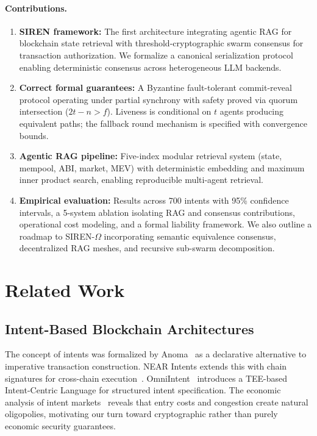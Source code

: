 \documentclass[11pt]{article}
\begin{document}
\paragraph{Contributions.}
\begin{enumerate}
  \item \textbf{SIREN framework:} The first architecture integrating agentic RAG for blockchain state retrieval with threshold-cryptographic swarm consensus for transaction authorization. We formalize a canonical serialization protocol enabling deterministic consensus across heterogeneous LLM backends.
  \item \textbf{Correct formal guarantees:} A Byzantine fault-tolerant commit-reveal protocol operating under partial synchrony with safety proved via quorum intersection ($2t - n > f$). Liveness is conditional on $t$ agents producing equivalent paths; the fallback round mechanism is specified with convergence bounds.
  \item \textbf{Agentic RAG pipeline:} Five-index modular retrieval system (state, mempool, ABI, market, MEV) with deterministic embedding and maximum inner product search, enabling reproducible multi-agent retrieval.
  \item \textbf{Empirical evaluation:} Results across 700 intents with 95\% confidence intervals, a 5-system ablation isolating RAG and consensus contributions, operational cost modeling, and a formal liability framework. We also outline a roadmap to SIREN-$\Omega$ incorporating semantic equivalence consensus, decentralized RAG meshes, and recursive sub-swarm decomposition.
\end{enumerate}

\section{Related Work}
\label{sec:related}

\subsection{Intent-Based Blockchain Architectures}

The concept of intents was formalized by Anoma~\cite{anoma_whitepaper} as a declarative alternative to imperative transaction construction. NEAR Intents extends this with chain signatures for cross-chain execution~\cite{near_intents}. OmniIntent~\cite{omniintent} introduces a TEE-based Intent-Centric Language for structured intent specification. The economic analysis of intent markets~\cite{intent_markets_economics} reveals that entry costs and congestion create natural oligopolies, motivating our turn toward cryptographic rather than purely economic security guarantees.
\end{document}
